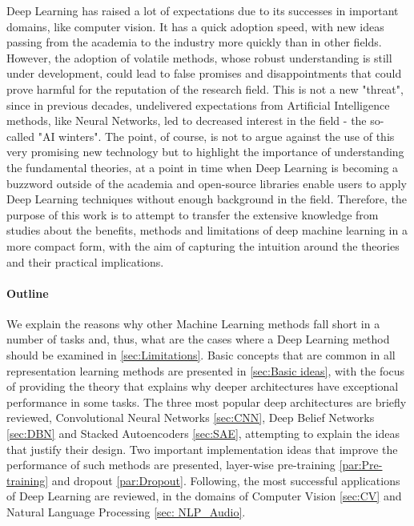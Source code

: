 \documentclass[a4paper]{article}
\begin{document}
	Deep Learning has raised a lot of expectations due to its successes in important domains, like computer vision. It has a quick adoption speed, with new ideas passing from the academia to the industry more quickly than in other fields. However, the adoption of volatile methods, whose robust understanding is still under development, could lead to false promises and disappointments that could prove harmful for the reputation of the research field. This is not a new "threat", since in previous decades, undelivered expectations from Artificial Intelligence methods, like Neural Networks, led to decreased interest in the field - the so-called "AI winters". The point, of course, is not to argue against the use of this very promising new technology but to highlight the importance of understanding the fundamental theories, at a point in time when Deep Learning is becoming a buzzword outside of the academia and open-source libraries enable users to apply Deep Learning techniques without enough background in the field. Therefore, the purpose of this work is to attempt to transfer the extensive knowledge from studies about the benefits, methods and limitations of deep machine learning in a more compact form, with the aim of capturing the intuition around the theories and their practical implications.
	
	
	\paragraph{Outline}
		We explain the reasons why other Machine Learning methods fall short in a number of tasks and, thus, what are the cases where a Deep Learning method should be examined in \autoref{sec:Limitations}.	Basic concepts that are common in all representation learning methods are presented in \autoref{sec:Basic ideas}, with the focus of providing the theory that explains why deeper architectures have exceptional performance in some tasks.
		The three most popular deep architectures are briefly reviewed, Convolutional Neural Networks \ref{sec:CNN}, Deep Belief Networks \ref{sec:DBN} and Stacked Autoencoders \ref{sec:SAE}, attempting to explain the ideas that justify their design. Two important implementation ideas that improve the performance of such methods are presented, layer-wise pre-training \ref{par:Pre-training} and dropout \ref{par:Dropout}.
		Following, the most successful applications of Deep Learning are reviewed, in the domains of Computer Vision \ref{sec:CV} and Natural Language Processing \ref{sec: NLP_Audio}.
		
\end{document}
